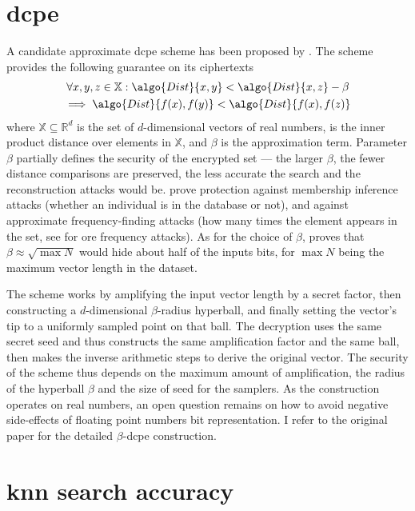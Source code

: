 	\section{\texorpdfstring{\acrlong{dcpe}}{Distance Comparison Preserving Encryption}}

		A candidate approximate \acrshort{dcpe} scheme has been proposed by \textcite{dcpe}.
		The scheme provides the following guarantee on its ciphertexts
		\begin{multline*}
			\forall x, y, z \in \mathbb{X} : \algo{Dist}{x, y} < \algo{Dist}{x, z} - \beta \\
			\implies \algo{Dist}{f(x), f(y)} < \algo{Dist}{f(x), f(z)}
		\end{multline*}
		where $\mathbb{X} \subseteq \mathbb{R}^d$ is the set of $d$-dimensional vectors of real numbers,  is the inner product distance over elements in $\mathbb{X}$, and $\beta$ is the approximation term.
		Parameter $\beta$ partially defines the security of the encrypted set --- the larger $\beta$, the fewer distance comparisons are preserved, the less accurate the search and the reconstruction attacks would be.
		\textcite{dcpe} prove protection against membership inference attacks \cite{memebership-inference-attacks-knn} (whether an individual is in the database or not), and against approximate frequency-finding attacks (how many times the element appears in the set, see \cite{leakage-abuse-grubs-2017} for \acrshort{ore} frequency attacks).
		As for the choice of $\beta$, \cite{dcpe} proves that $\beta \approx \sqrt{\max N}$ would hide about half of the inputs bits, for $\max N$ being the maximum vector length in the dataset.

		The scheme works by amplifying the input vector length by a secret factor, then constructing a $d$-dimensional $\beta$-radius hyperball, and finally setting the vector's tip to a uniformly sampled point on that ball.
		The decryption uses the same secret seed and thus constructs the same amplification factor and the same ball, then makes the inverse arithmetic steps to derive the original vector.
		The security of the scheme thus depends on the maximum amount of amplification, the radius of the hyperball $\beta$ and the size of seed for the samplers.
		As the construction operates on real numbers, an open question remains on how to avoid negative side-effects of floating point numbers bit representation.
		I refer to the original paper \cite{dcpe} for the detailed $\beta$-\acrshort{dcpe} construction.

	\section{\texorpdfstring{\acrshort{knn}}{kNN} search accuracy}


